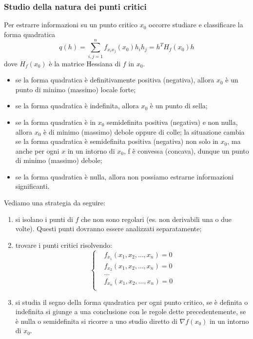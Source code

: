 \subsubsection*{Studio della natura dei punti critici}
Per estrarre informazioni su un punto critico $x_0$ occorre studiare e classificare la forma quadratica 
\[
    q(h) = \sum_{i,j=1}^{n}f_{x_ix_j}(x_0)h_ih_j = h^TH_f(x_0)h
\]
dove $H_f(x_0)$ è la matrice Hessiana di $f$ in $x_0$.\newline
\begin{itemize}
    \item se la forma quadratica è definitivamente positiva (negativa), allora $x_0$ è un punto di minimo (massimo) locale forte;
    \item se la forma quadratica è indefinita, allora $x_0$ è un punto di sella;
    \item se la forma quadratica è in $x_0$ semidefinita positiva (negativa) e non nulla, allora $x_0$ è di minimo (massimo) debole oppure di colle; la situazione cambia se la forma quadratica è semidefinita positiva (negativa) non solo in $x_0$, ma anche per ogni $x$ in un intorno di $x_0$, f è convessa (concava), dunque un punto di minimo (massimo) debole;
    \item se la forma quadratica è nulla, allora non possiamo estrarne informazioni significanti.
\end{itemize}
Vediamo una strategia da seguire:
\begin{enumerate}
    \item si isolano i punti di $f$ che non sono regolari (es. non derivabili una o due volte). Questi punti dovranno essere analizzati separatamente;
    \item trovare i punti critici risolvendo:
        \[
            \begin{cases}
                &f_{x_1}(x_1,x_2,\dots,x_n) = 0\\
                &f_{x_2}(x_1,x_2,\dots,x_n) = 0\\
                &\dots\\
                &f_{x_n}(x_1,x_2,\dots,x_n) = 0\\
            \end{cases}
        \]
    \item si studia il segno della forma quadratica per ogni punto critico, se è definita o indefinita si giunge a una conclusione con le regole dette precedentemente, se è nulla o semidefinita si ricorre a uno studio diretto di $\nabla f(x_0)$ in un intorno di $x_0$.
\end{enumerate}
